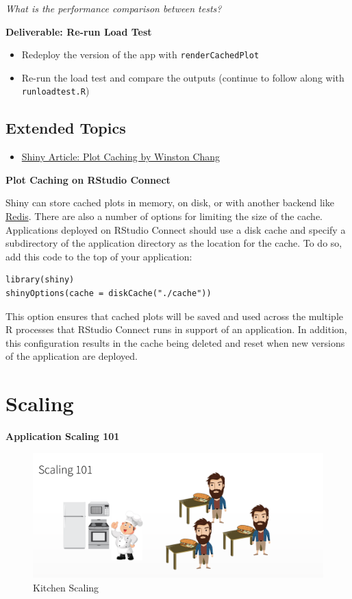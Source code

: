 \documentclass[]{book}
\providecommand{\tightlist}{%
  \setlength{\itemsep}{0pt}\setlength{\parskip}{0pt}}
\theoremstyle{definition}
\theoremstyle{definition}
\theoremstyle{definition}
\theoremstyle{remark}
\begin{document}
\emph{What is the performance comparison between tests?}

\textbf{Deliverable: Re-run Load Test}

\begin{itemize}
\tightlist
\item
  Redeploy the version of the app with \texttt{renderCachedPlot}
\item
  Re-run the load test and compare the outputs (continue to follow along
  with \texttt{runloadtest.R})
\end{itemize}

\hypertarget{extended-topics-1}{%
\section{Extended Topics}\label{extended-topics-1}}

\begin{itemize}
\tightlist
\item
  \href{http://shiny.rstudio.com/articles/plot-caching.html}{Shiny
  Article: Plot Caching by Winston Chang}
\end{itemize}

\textbf{Plot Caching on RStudio Connect}

Shiny can store cached plots in memory, on disk, or with another backend
like \href{https://redis.io/}{Redis}. There are also a number of options
for limiting the size of the cache. Applications deployed on RStudio
Connect should use a disk cache and specify a subdirectory of the
application directory as the location for the cache. To do so, add this
code to the top of your application:

\begin{verbatim}
library(shiny)
shinyOptions(cache = diskCache("./cache"))
\end{verbatim}

This option ensures that cached plots will be saved and used across the
multiple R processes that RStudio Connect runs in support of an
application. In addition, this configuration results in the cache being
deleted and reset when new versions of the application are deployed.

\hypertarget{scaling}{%
\chapter{Scaling}\label{scaling}}

\textbf{Application Scaling 101}

\begin{figure}
\centering
\includegraphics{imgs/scaling/kitchen-scaling.png}
\caption{Kitchen Scaling}
\end{figure}
\end{document}
